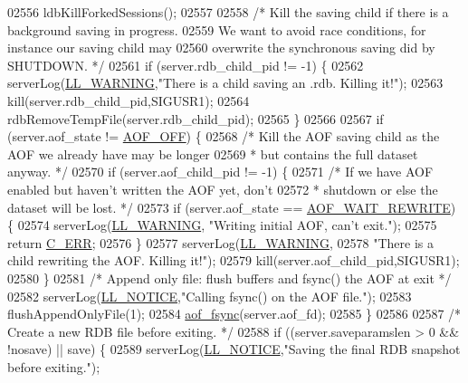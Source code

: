 \begin{DoxyCode}
{{{{{{{{{{{{{{{{{{{{{{{{{{{{{{{{02556     ldbKillForkedSessions();
02557 
02558     \textcolor{comment}{/* Kill the saving child if there is a background saving in progress.}
02559 \textcolor{comment}{       We want to avoid race conditions, for instance our saving child may}
02560 \textcolor{comment}{       overwrite the synchronous saving did by SHUTDOWN. */}
02561     \textcolor{keywordflow}{if} (server.rdb\_child\_pid != -1) \{
02562         serverLog(\hyperlink{server_8h_a31229b9334bba7d6be2a72970967a14b}{LL\_WARNING},\textcolor{stringliteral}{"There is a child saving an .rdb. Killing it!"});
02563         kill(server.rdb\_child\_pid,SIGUSR1);
02564         rdbRemoveTempFile(server.rdb\_child\_pid);
02565     \}
02566 
02567     \textcolor{keywordflow}{if} (server.aof\_state != \hyperlink{server_8h_a5226306fbcebcb6d5d02e0fef3c213c2}{AOF\_OFF}) \{
02568         \textcolor{comment}{/* Kill the AOF saving child as the AOF we already have may be longer}
02569 \textcolor{comment}{         * but contains the full dataset anyway. */}
02570         \textcolor{keywordflow}{if} (server.aof\_child\_pid != -1) \{
02571             \textcolor{comment}{/* If we have AOF enabled but haven't written the AOF yet, don't}
02572 \textcolor{comment}{             * shutdown or else the dataset will be lost. */}
02573             \textcolor{keywordflow}{if} (server.aof\_state == \hyperlink{server_8h_a7d4b86c89be4d951fbf048130431a16a}{AOF\_WAIT\_REWRITE}) \{
02574                 serverLog(\hyperlink{server_8h_a31229b9334bba7d6be2a72970967a14b}{LL\_WARNING}, \textcolor{stringliteral}{"Writing initial AOF, can't exit."});
02575                 \textcolor{keywordflow}{return} \hyperlink{server_8h_af98ac28d5f4d23d7ed5985188e6fb7d1}{C\_ERR};
02576             \}
02577             serverLog(\hyperlink{server_8h_a31229b9334bba7d6be2a72970967a14b}{LL\_WARNING},
02578                 \textcolor{stringliteral}{"There is a child rewriting the AOF. Killing it!"});
02579             kill(server.aof\_child\_pid,SIGUSR1);
02580         \}
02581         \textcolor{comment}{/* Append only file: flush buffers and fsync() the AOF at exit */}
02582         serverLog(\hyperlink{server_8h_a8c54c191e436c7dd3012167212692401}{LL\_NOTICE},\textcolor{stringliteral}{"Calling fsync() on the AOF file."});
02583         flushAppendOnlyFile(1);
02584         \hyperlink{config_8h_af5994c643c434574580bb7816af82cad}{aof\_fsync}(server.aof\_fd);
02585     \}
02586 
02587     \textcolor{comment}{/* Create a new RDB file before exiting. */}
02588     \textcolor{keywordflow}{if} ((server.saveparamslen > 0 && !nosave) || save) \{
02589         serverLog(\hyperlink{server_8h_a8c54c191e436c7dd3012167212692401}{LL\_NOTICE},\textcolor{stringliteral}{"Saving the final RDB snapshot before exiting."});
}}}}}}}}}}}}}}}}}}}}}}}}}}}}}}}}
\end{DoxyCode}
